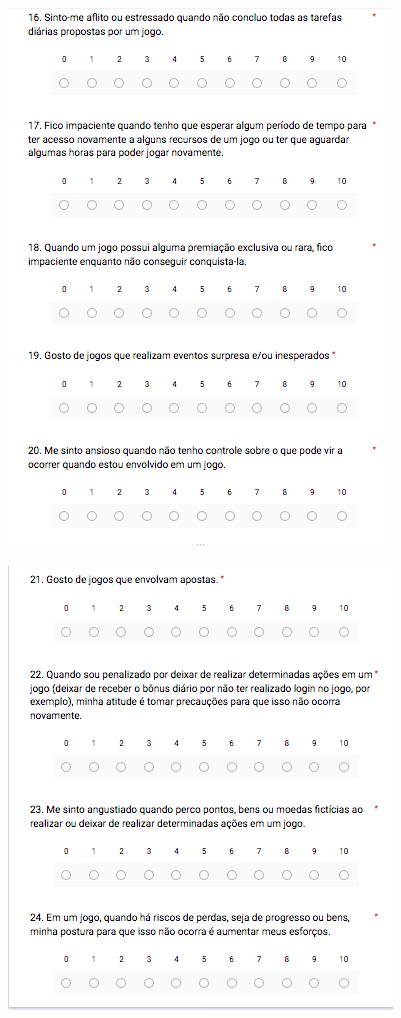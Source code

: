 \begin{apendicesenv}
\begin{figure}[h]
	\centering
	\includegraphics[keepaspectratio=true,scale=0.9]{figuras/q9.png}
\end{figure}

\begin{figure}[h]
	\centering
	\includegraphics[keepaspectratio=true,scale=0.9]{figuras/q10.png}
\end{figure}


\end{apendicesenv}

